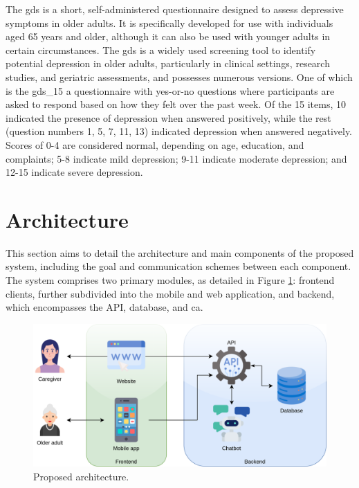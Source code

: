 \documentclass[a4paper,fleqn]{cas-sc}
\begin{document}
The \gls{gds} \cite{yesavage_development_1982} is a short, self-administered questionnaire designed to assess depressive symptoms in older adults. It is specifically developed for use with individuals aged 65 years and older, although it can also be used with younger adults in certain circumstances. The \gls{gds} is a widely used screening tool to identify potential depression in older adults, particularly in clinical settings, research studies, and geriatric assessments, and possesses numerous versions. One of which is the \gls{gds_15} a questionnaire with yes-or-no questions where participants are asked to respond based on how they felt over the past week.  Of the 15 items, 10 indicated the presence of depression when answered positively, while the rest (question numbers 1, 5, 7, 11, 13) indicated depression when answered negatively. Scores of 0-4 are considered normal, depending on age, education, and complaints; 5-8 indicate mild depression; 9-11 indicate moderate depression; and 12-15 indicate severe depression. 

\section{Architecture}
\label{architecture}


This section aims to detail the architecture and main components of the proposed system, including the goal and communication schemes between each component. The system comprises two primary modules, as detailed in Figure \ref{fig:lArchitecture}: frontend clients, further subdivided into the mobile and web application, and backend, which encompasses the API, database, and \gls{ca}.

\begin{figure}[htbp]
	\centering
	\includegraphics[width=\linewidth]{figs/Architecture.png}
	\caption{Proposed architecture.}
	\label{fig:lArchitecture}
\end{figure}
\end{document}
